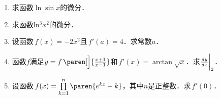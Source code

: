 \documentclass[a4paper,punct=CCT]{ctexbook}
\theoremstyle{definition}
\theoremstyle{remark}
\newif\ifshowsol
\begin{document}
\begin{enumerate}
\item 求函数\(\ln\sin x\)的微分．
  \ifshowsol
  \begin{equation*}
    \diff(\ln\sin x)
    = \frac1{\sin x} \diff(\sin x)
    = \frac{\cos x}{\sin x} \dx
    = \cot x \dx
  \end{equation*}
  \fi

\item 求函数\(\operatorname{ln^3} x^2\)的微分．
  \ifshowsol
  \begin{equation*}
    \diff\paren{\operatorname{ln^3} x^2}
    = 3\operatorname{ln^2} x^2 \diff\paren{\ln x^2}
    = 3\operatorname{ln^2} x^2 \cdot \frac1{x^2} \diff\paren{x^2}
    = 3\operatorname{ln^2} x^2 \cdot \frac1{x^2} \cdot 2x \dx
    = \frac{6 \operatorname{ln^2} x^2}{x} \dx.
  \end{equation*}
  \fi

\item 设函数\(\,f(x) = -2x^2\)且\(\,f'(a) = 4\)．求常数\(a\)．

  \ifshowsol
  因为\(f'(x) = -4x\)，所以\(f'(a) = -4\,a = 4\)，即\(a = -1\)．
  \fi

\item 函数\(f\)满足\(y = f\,\paren[\Big]{\frac{x+1}{x-1}} \)和\(\,f'(x) = \arctan\sqrt x\)．求\(\frac{\mathop{}\!\mathit{d} y}{\mathop{}\!\mathit{d} x}\bigg\vert_{2}\)．
  \ifshowsol
  \begin{equation*}
    \dydx\Bigg\vert_{2}
    = f'(3) \cdot \paren[\bigg]{\frac{x+1}{x-1}}'\Bigg\vert_{2}
    = \arctan\sqrt3 \cdot \paren[\bigg]{-\frac{2}{(x-1)^2}} \Bigg\vert_{2}
    = - \frac23 \pi.
  \end{equation*}
  \fi

\item 设函数\(\,f(x) = \prod\limits_{k=1}^n \paren{e^{kx}-k}\)，其中\(n\)是正整数．求\(\,f'(0)\)．


\end{enumerate}
\end{document}
